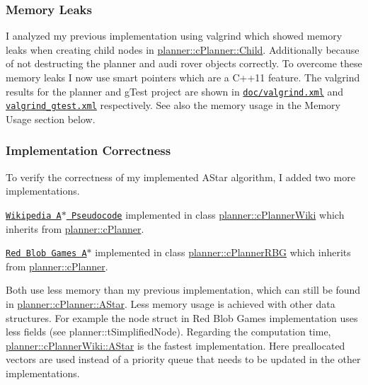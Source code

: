 \subsubsection*{Memory Leaks}

I analyzed my previous implementation using valgrind which showed memory leaks when creating child nodes in \mbox{\hyperlink{classplanner_1_1c_planner_adbffc6ce05119c940a09369d7e61554e}{planner\+::c\+Planner\+::\+Child}}. Additionally because of not destructing the planner and audi rover objects correctly. To overcome these memory leaks I now use smart pointers which are a C++11 feature. The valgrind results for the planner and g\+Test project are shown in \href{doc/valgrind.xml}{\tt doc/valgrind.\+xml} and \href{valgrind_gtest.xml}{\tt valgrind\+\_\+gtest.\+xml} respectively. See also the memory usage in the Memory Usage section below.

\subsubsection*{Implementation Correctness}

To verify the correctness of my implemented A\+Star algorithm, I added two more implementations.
\begin{DoxyEnumerate}
\item \href{https://en.wikipedia.org/wiki/A*_search_algorithm#Pseudocode}{\tt Wikipedia A$\ast$ Pseudocode} implemented in class \mbox{\hyperlink{classplanner_1_1c_planner_wiki}{planner\+::c\+Planner\+Wiki}} which inherits from \mbox{\hyperlink{classplanner_1_1c_planner}{planner\+::c\+Planner}}.
\item \href{https://www.redblobgames.com/pathfinding/a-star/implementation.html#cplusplus}{\tt Red Blob Games A$\ast$} implemented in class \mbox{\hyperlink{classplanner_1_1c_planner_r_b_g}{planner\+::c\+Planner\+R\+BG}} which inherits from \mbox{\hyperlink{classplanner_1_1c_planner}{planner\+::c\+Planner}}.
\end{DoxyEnumerate}

Both use less memory than my previous implementation, which can still be found in \mbox{\hyperlink{classplanner_1_1c_planner_a341e70531266f023ac9461d18979d1ef}{planner\+::c\+Planner\+::\+A\+Star}}. Less memory usage is achieved with other data structures. For example the node struct in Red Blob Games implementation uses less fields (see planner\+::t\+Simplified\+Node). Regarding the computation time, \mbox{\hyperlink{classplanner_1_1c_planner_wiki_aa673ebc2b1b43af3b13fb0c958c5f2e4}{planner\+::c\+Planner\+Wiki\+::\+A\+Star}} is the fastest implementation. Here preallocated vectors are used instead of a priority queue that needs to be updated in the other implementations.

